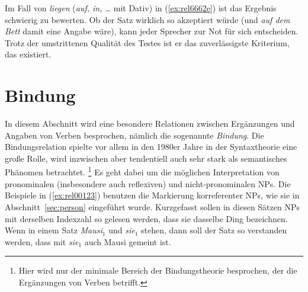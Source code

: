 \begin{exe}
  \ex\label{ex:rel6662}
  \begin{xlist}
  \end{xlist}
\end{exe}

Im Fall von \textit{liegen} (\textit{auf, in, \ldots} mit Dativ) in (\ref{ex:rel6662e}) ist das Ergebnis schwierig zu bewerten.
Ob der Satz wirklich so akzeptiert würde (und \textit{auf dem Bett} damit eine Angabe wäre), kann jeder Sprecher zur Not für sich entscheiden.
Trotz der umstrittenen Qualität des Testes ist er das zuverlässigste Kriterium, das existiert.



\section{Bindung}

\label{sec:bindung}

In diesem Abschnitt wird eine besondere Relationen zwischen Ergänzungen und Angaben von Verben besprochen, nämlich die sogenannte \textit{Bindung}.
Die Bindungsrelation spielte vor allem in den 1980er Jahre in der Syntaxtheorie eine große Rolle, wird inzwischen aber tendentiell auch sehr stark als semantisches Phänomen betrachtet.%
\footnote{Hier wird nur der minimale Bereich der Bindungstheorie besprochen, der die Ergänzungen von Verben betrifft.}
Es geht dabei um die möglichen Interpretation von pronominalen (insbesondere auch reflexiven) und nicht-pronominalen NPs.
Die Beispiele in (\ref{ex:rel00123}) benutzen die Markierung korreferenter NPs, wie sie in Abschnitt~\ref{sec:person} eingeführt wurde.
Kurzgefasst sollen in diesen Sätzen NPs mit derselben Indexzahl so gelesen werden, dass sie dasselbe Ding bezeichnen.
Wenn in einem Satz \textit{Mausi$_1$} und \textit{sie$_1$} stehen, dann soll der Satz so verstanden werden, dass mit \textit{sie$_1$} auch Mausi gemeint ist.

